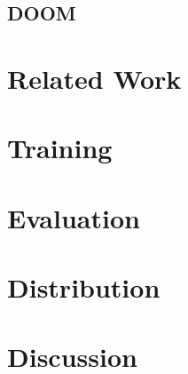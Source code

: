 \documentclass[letterpaper,twocolumn,10pt]{article}
\begin{document}
        \subsection{DOOM}
    \section{Related Work}
    \section{Training}
    \section{Evaluation}
    \section{Distribution}
    \section{Discussion}

     
    
\end{document}
